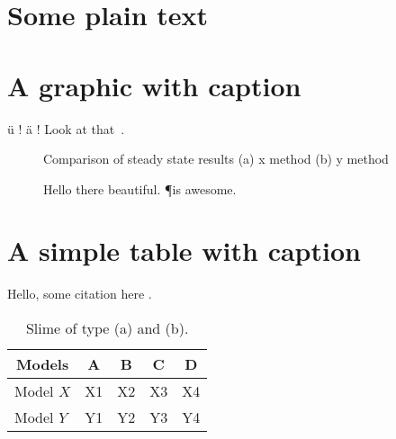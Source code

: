 \chapter{Some plain text}

\blindtext

\chapter{A graphic with caption}

ü ! ä ! Look at that~\cite{newman2003structure}.

\begin{figure}
     \centering
     \caption[short toc caption]{Comparison of steady state results (a) x method (b) y method}
     \label{fig:oats}
\end{figure}


\begin{figure}
     \centering
     \caption[another short toc caption]{Hello there beautiful. \P is awesome.}
     \label{fig:slime}
\end{figure}

\chapter{A simple table with caption}

Hello, some citation here .

\begin{table}
	\centering
	\begin{tabular}{@{} l *4c @{}}
	\toprule
	 \multicolumn{1}{c}{Models}    & A  & B  & C  & D  \\ 
	\midrule
	 Model $X$ & X1 & X2 & X3 & X4 \\ 
	 Model $Y$ & Y1 & Y2 & Y3 & Y4 \\
	\bottomrule
	\end{tabular}
	\caption[another short toc caption]{Slime of type (a) and (b).}
	\label{tab:income}
\end{table}
